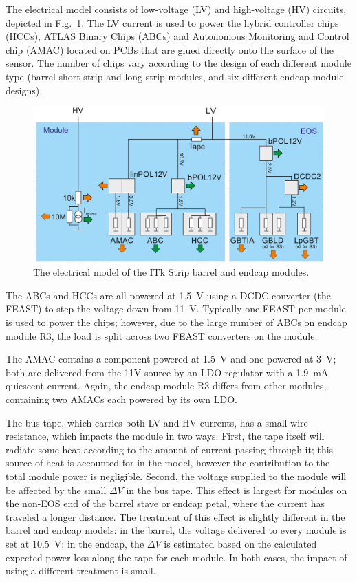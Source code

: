 
The electrical model consists of low-voltage (LV) and high-voltage (HV) circuits, depicted in
Fig.~\ref{electrical_model}. The LV current is used to power the hybrid controller chips (HCCs),
ATLAS Binary Chips (ABCs) and Autonomous Monitoring and Control chip (AMAC) located on PCBs that are
glued directly onto the surface of the sensor. The number of chips vary according to the design of
each different module type (barrel short-strip and long-strip modules, and six different endcap
module designs).

\begin{figure}[ht!]
\centering
\includegraphics[width=0.8\linewidth]{figures/electrical_model.pdf}
\caption{
The electrical model of the ITk Strip barrel and endcap modules.
}
\label{electrical_model}
\end{figure}

The ABCs and HCCs are all powered at 1.5~V using a DCDC converter (the FEAST) to step the voltage down
from 11~V. Typically one FEAST per module is used to power the chips; however, due to the large
number of ABCs on endcap module R3, the load is split across two FEAST converters on the module.

The AMAC contains a component powered at 1.5~V and one powered at 3~V; both are delivered from the
11V source by an LDO regulator with a 1.9~mA quiescent current.
Again, the endcap module R3 differs from other modules, containing two AMACs each powered by its own
LDO.

The bus tape, which carries both LV and HV currents, has a small wire resistance, which impacts the
module in two ways. First,
the tape itself will radiate some heat according to the amount of current passing through it; this
source of heat is accounted for in the model, however the contribution to the total module power
is negligible.
Second,
the voltage supplied to the module will be affected by the small $\Delta V$ in the bus tape. This
effect is largest for modules on the non-EOS end of the barrel stave or endcap petal, where the current
has traveled a longer distance. The treatment of this effect is slightly different in the barrel and
endcap models: in the barrel, the voltage delivered to every module is set at 10.5~V; in the endcap,
the $\Delta V$ is estimated based on the calculated expected power loss along the tape for each module.
In both cases, the impact of using a different treatment is small.

